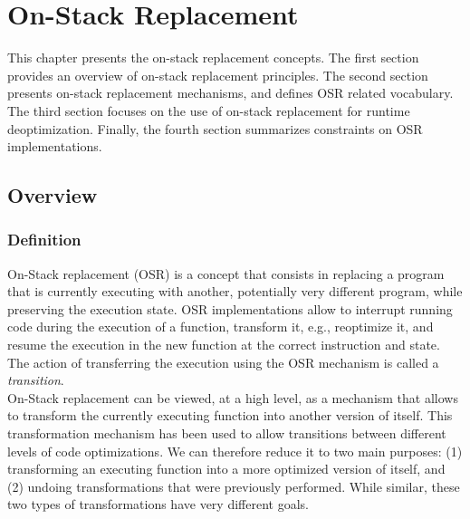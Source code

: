 
\chapter{On-Stack Replacement} %

\label{Chapter2} %


\newcommand{\keyword}[1]{\textbf{#1}}
\newcommand{\tabhead}[1]{\textbf{#1}}
\newcommand{\code}[1]{\texttt{#1}}
\newcommand{\file}[1]{\texttt{\bfseries#1}}
\newcommand{\option}[1]{\texttt{\itshape#1}}

This chapter presents the on-stack replacement concepts.
The first section provides an overview of on-stack replacement principles.
The second section presents on-stack replacement mechanisms, and defines OSR related vocabulary.
The third section focuses on the use of on-stack replacement for runtime deoptimization.
Finally, the fourth section summarizes constraints on OSR implementations.\\

\section{Overview}
\subsection{Definition}

On-Stack replacement (OSR) is a concept that consists in replacing a program that is currently executing with another, potentially very different program, while preserving the execution state.
OSR implementations allow to interrupt running code during the execution of a function, transform it, e.g., reoptimize it, and resume the execution in the new function at the correct instruction and state.
The action of transferring the execution using the OSR mechanism is called a \textit{transition}.\\

On-Stack replacement can be viewed, at a high level, as a mechanism that allows to transform the currently executing function into another version of itself.
This transformation mechanism has been used to allow transitions between different levels of code optimizations.
We can therefore reduce it to two main purposes: (1) transforming an executing function into a more optimized version of itself, and (2) undoing transformations that were previously performed.
While similar, these two types of transformations have very different goals.\\

